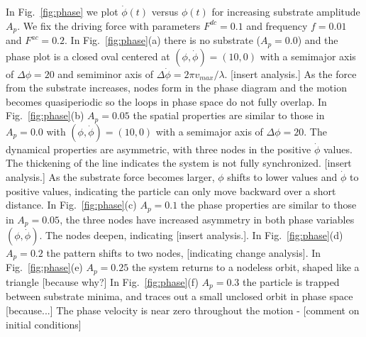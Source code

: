 \documentclass[twocolumn,preprintnumbers,amsmath,amssymb,aps,prx]{revtex4}
\begin{document}
  In Fig.~\ref{fig:phase}
  we plot $\dot{\phi}(t)$ versus $\phi(t)$
  for increasing substrate amplitude $A_p$.
  We fix the driving force with parameters
  $F^{dc} = 0.1$ and frequency $f = 0.01$ and $F^{ac} = 0.2$.
  In Fig.~\ref{fig:phase}(a)
  there is no substrate ($A_p = 0.0$)
  and the phase plot is a closed oval
  centered at
  $(\phi,\dot{\phi})=(10,0)$
  with a semimajor axis of $\Delta \phi = 20$ %
  and semiminor axis of $\Delta \dot{\phi} = 2\pi v_{max} /\lambda$.
  [insert analysis.]
  As the force from the substrate
  increases,
  nodes form in the phase diagram
  and the motion becomes quasiperiodic
  so the loops in phase space do not fully overlap.
  In Fig.~\ref{fig:phase}(b)
  $A_p = 0.05$
  the spatial properties are similar to
  those in $A_p = 0.0$
  with 
  $(\phi,\dot{\phi})=(10,0)$
  with a semimajor axis of $\Delta \phi = 20$.
  The dynamical properties
  are asymmetric,
  with three nodes in the positive $\dot{\phi}$ values.
  The thickening of the line
  indicates the system is not fully synchronized.
  [insert analysis.]
  As the substrate
  force becomes larger,
  $\phi$ shifts to lower values
  and $\dot{\phi}$ to positive values,
  indicating
  the particle can only move 
  backward over a short distance.
  In Fig.~\ref{fig:phase}(c)
  $A_p = 0.1$
  the phase properties are similar to
  those in $A_p = 0.05$,
  the three nodes have 
  increased asymmetry in both phase variables 
  $(\phi,\dot{\phi})$.
  The nodes deepen,
  indicating [insert analysis.].
  In Fig.~\ref{fig:phase}(d)
  $A_p = 0.2$
  the pattern shifts
  to two nodes,
  [indicating change analysis].
  In Fig.~\ref{fig:phase}(e)
  $A_p = 0.25$
  the system returns to a nodeless
  orbit,
  shaped like a triangle [because why?]
  In Fig.~\ref{fig:phase}(f)
  $A_p = 0.3$
  the particle is trapped between substrate minima,
  and traces out a small unclosed
  orbit in phase space [because...]
  The phase velocity is near zero
  throughout the motion -
  [comment on initial conditions]
\end{document}
